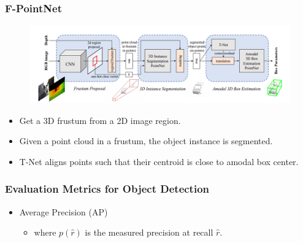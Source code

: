 \documentclass[10pt,fleqn,unknownkeysallowed]{beamer}
\begin{document}
\begin{frame}
	\frametitle{F-PointNet}
	\begin{figure}
		\begin{center}
			\includegraphics[width=1.0\linewidth]{images/pointnet/fpointNet_arch} \\
		\end{center}
	\end{figure}
	\begin{itemize}
	    \item Get a 3D frustum from a 2D image region.
	    \item  Given a point cloud in a frustum, the object instance is segmented.
	    \item T-Net aligns points such that their centroid is close to amodal box center.
	\end{itemize}
\end{frame}

\begin{frame}
	\frametitle{Evaluation Metrics for Object Detection}
	\begin{itemize}
		\item{Average Precision (AP)}
		\begin{itemize}
		    \begin{align*}
				AP = \frac{1}{11} \sum_{r \in{0,0.1,...,1}}^{} p_{interp}(r)\\
				p_{interp}(r) = \max_{\hat{r}:\hat{r} \geq r} p(\hat{r})
			\end{align*}
			\item{where $p(\hat{r})$ is the measured precision at recall $\hat{r}$.}
		\end{itemize}
	\end{itemize}
\end{frame}
\end{document}
